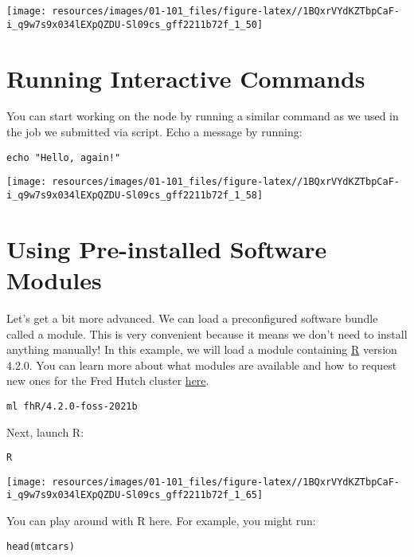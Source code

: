 \documentclass[
]{book}
\begin{document}
\texttt{[image: resources/images/01-101\_files/figure-latex//1BQxrVYdKZTbpCaF-i\_q9w7s9x034lEXpQZDU-Sl09cs\_gff2211b72f\_1\_50]}

\hypertarget{running-interactive-commands}{%
\section{Running Interactive Commands}\label{running-interactive-commands}}

You can start working on the node by running a similar command as we used in the job we submitted via script. Echo a message by running:

\begin{verbatim}
echo "Hello, again!"
\end{verbatim}

\texttt{[image: resources/images/01-101\_files/figure-latex//1BQxrVYdKZTbpCaF-i\_q9w7s9x034lEXpQZDU-Sl09cs\_gff2211b72f\_1\_58]}

\hypertarget{using-pre-installed-software-modules}{%
\section{Using Pre-installed Software Modules}\label{using-pre-installed-software-modules}}

Let's get a bit more advanced. We can load a preconfigured software bundle called a module. This is very convenient because it means we don't need to install anything manually! In this example, we will load a module containing \href{https://www.r-project.org/}{R} version 4.2.0. You can learn more about what modules are available and how to request new ones for the Fred Hutch cluster \href{https://sciwiki.fredhutch.org/scicomputing/compute_scientificSoftware/}{here}.

\begin{verbatim}
ml fhR/4.2.0-foss-2021b
\end{verbatim}

Next, launch R:

\begin{verbatim}
R
\end{verbatim}

\texttt{[image: resources/images/01-101\_files/figure-latex//1BQxrVYdKZTbpCaF-i\_q9w7s9x034lEXpQZDU-Sl09cs\_gff2211b72f\_1\_65]}

You can play around with R here. For example, you might run:

\begin{verbatim}
head(mtcars)
\end{verbatim}
\end{document}
